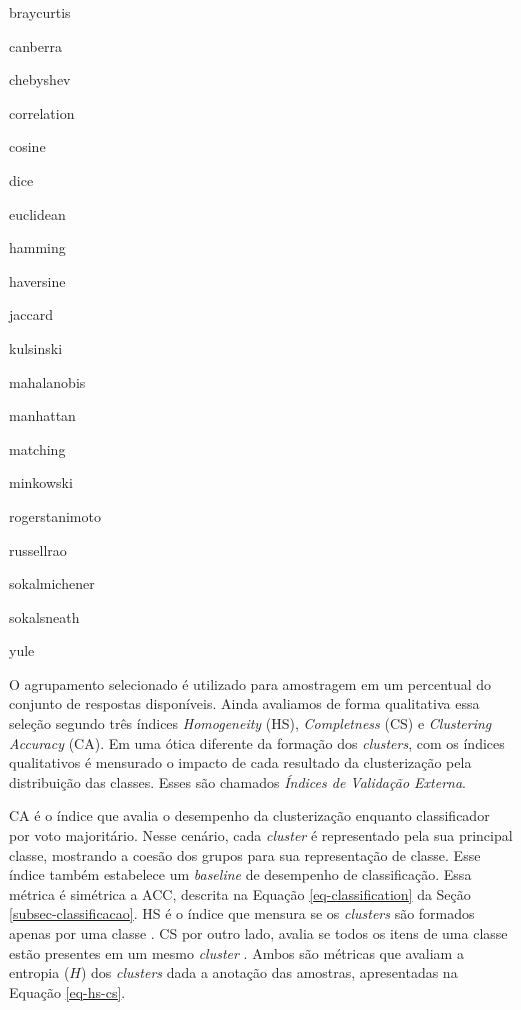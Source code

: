 \begin{itemize}
\begin{multicols}{4}
  \item braycurtis
  \item canberra
  \item chebyshev
  \item correlation
  \item cosine
  \item dice
  \item euclidean
  \item hamming
  \item haversine
  \item jaccard
  \item kulsinski
  \item mahalanobis
  \item manhattan
  \item matching
  \item minkowski
  \item rogerstanimoto
  \item russellrao
  \item sokalmichener
  \item sokalsneath
  \item yule
  \end{multicols}
\end{itemize}

O agrupamento selecionado é utilizado para amostragem em um percentual do conjunto de respostas disponíveis. Ainda avaliamos de forma qualitativa essa seleção segundo três índices \textit{Homogeneity} (HS), \textit{Completness} (CS) e \textit{Clustering Accuracy} (CA). Em uma ótica diferente da formação dos \textit{clusters}, com os índices qualitativos é mensurado o impacto de cada resultado da clusterização pela distribuição das classes. Esses são chamados \textit{Índices de Validação Externa}.

CA é o índice que avalia o desempenho da clusterização enquanto classificador por voto majoritário. Nesse cenário, cada \textit{cluster} é representado pela sua principal classe, mostrando a coesão dos grupos para sua representação de classe. Esse índice também estabelece um \textit{baseline} de desempenho de classificação. Essa métrica é simétrica a ACC, descrita na Equação \ref{eq-classification} da Seção \ref{subsec-classificacao}. HS é o índice que mensura se os \textit{clusters} são formados apenas por uma classe \cite{rosenberg2007}. CS por outro lado, avalia se todos os itens de uma classe estão presentes em um mesmo \textit{cluster} \cite{rosenberg2007}. Ambos são métricas que avaliam a entropia ($H$) dos \textit{clusters} dada a anotação das amostras, apresentadas na Equação \ref{eq-hs-cs}.


